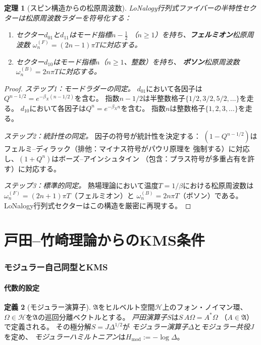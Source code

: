 \documentclass[12pt]{article}
\theoremstyle{plain}
\newtheorem{theorem}{定理}[section]
\theoremstyle{definition}
\newtheorem{definition}[theorem]{定義}
\numberwithin{equation}{section}
\newcommand{\fA}{\mathfrak{A}}
\begin{document}
\begin{theorem}[スピン構造からの松原周波数]\label{thm:matsubara}
LoNalogy行列式ファイバーの半特性セクターは松原周波数ラダーを符号化する：
\begin{enumerate}[label=(\roman*)]
\item セクター$d_{01}$と$d_{11}$はモード指標$n-\frac{1}{2}$
（$n\geq 1$）を持ち、\textbf{フェルミオン}松原周波数
$\omega_n^{(F)} = (2n-1)\pi T$に対応する。
\item セクター$d_{10}$はモード指標$n$（$n\geq 1$、整数）を持ち、
\textbf{ボソン}松原周波数$\omega_n^{(B)} = 2n\pi T$に対応する。
\end{enumerate}
\end{theorem}

\begin{proof}
\emph{ステップ1：モードラダーの同定。}
$d_{01}$において各因子は$Q^{n-1/2}=e^{-\beta_X(n-1/2)}$を含む。
指数$n-1/2$は半整数格子$\{1/2,3/2,5/2,\ldots\}$を走る。
$d_{10}$において各因子は$Q^n=e^{-\beta_X n}$を含む。
指数$n$は整数格子$\{1,2,3,\ldots\}$を走る。

\emph{ステップ2：統計性の同定。}
因子の符号が統計性を決定する：
$(1-Q^{n-1/2})$はフェルミ--ディラック（排他：マイナス符号がパウリ原理を
強制する）に対応し、$(1+Q^n)$はボーズ--アインシュタイン
（包含：プラス符号が多重占有を許す）に対応する。

\emph{ステップ3：標準的同定。}
熱場理論において温度$T=1/\beta$における松原周波数は
$\omega_n^{(F)}=(2n+1)\pi T$（フェルミオン）と
$\omega_n^{(B)}=2n\pi T$（ボソン）である。
LoNalogy行列式セクターはこの構造を厳密に再現する。
\end{proof}


\part{戸田--竹崎理論からのKMS条件}

\section{モジュラー自己同型とKMS}\label{sec:kms}

\subsection{代数的設定}

\begin{definition}[モジュラー演算子]
$\fA$をヒルベルト空間$\mathcal{H}$上のフォン・ノイマン環、
$\Omega\in\mathcal{H}$を$\fA$の巡回分離ベクトルとする。
\emph{戸田演算子}$S$は$S\,A\Omega = A^*\Omega$
（$A\in\fA$）で定義される。
その極分解$S=J\Delta^{1/2}$が
\emph{モジュラー演算子}$\Delta$と\emph{モジュラー共役}$J$を定め、
\emph{モジュラーハミルトニアン}は$H_{\mathrm{mod}} := -\log\Delta$。
\end{definition}
\end{document}
